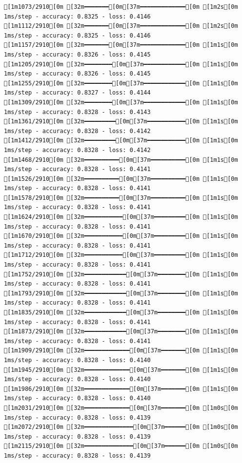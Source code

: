 \documentclass[
  letterpaper,
  DIV=11,
  numbers=noendperiod]{scrartcl}
\begin{document}
\begin{verbatim}
[1m1073/2910[0m [32m━━━━━━━[0m[37m━━━━━━━━━━━━━[0m [1m2s[0m 1ms/step - accuracy: 0.8325 - loss: 0.4146
[1m1112/2910[0m [32m━━━━━━━[0m[37m━━━━━━━━━━━━━[0m [1m2s[0m 1ms/step - accuracy: 0.8325 - loss: 0.4146
[1m1157/2910[0m [32m━━━━━━━[0m[37m━━━━━━━━━━━━━[0m [1m1s[0m 1ms/step - accuracy: 0.8326 - loss: 0.4145
[1m1205/2910[0m [32m━━━━━━━━[0m[37m━━━━━━━━━━━━[0m [1m1s[0m 1ms/step - accuracy: 0.8326 - loss: 0.4145
[1m1255/2910[0m [32m━━━━━━━━[0m[37m━━━━━━━━━━━━[0m [1m1s[0m 1ms/step - accuracy: 0.8327 - loss: 0.4144
[1m1309/2910[0m [32m━━━━━━━━[0m[37m━━━━━━━━━━━━[0m [1m1s[0m 1ms/step - accuracy: 0.8328 - loss: 0.4143
[1m1361/2910[0m [32m━━━━━━━━━[0m[37m━━━━━━━━━━━[0m [1m1s[0m 1ms/step - accuracy: 0.8328 - loss: 0.4142
[1m1412/2910[0m [32m━━━━━━━━━[0m[37m━━━━━━━━━━━[0m [1m1s[0m 1ms/step - accuracy: 0.8328 - loss: 0.4142
[1m1468/2910[0m [32m━━━━━━━━━━[0m[37m━━━━━━━━━━[0m [1m1s[0m 1ms/step - accuracy: 0.8328 - loss: 0.4141
[1m1526/2910[0m [32m━━━━━━━━━━[0m[37m━━━━━━━━━━[0m [1m1s[0m 1ms/step - accuracy: 0.8328 - loss: 0.4141
[1m1578/2910[0m [32m━━━━━━━━━━[0m[37m━━━━━━━━━━[0m [1m1s[0m 1ms/step - accuracy: 0.8328 - loss: 0.4141
[1m1624/2910[0m [32m━━━━━━━━━━━[0m[37m━━━━━━━━━[0m [1m1s[0m 1ms/step - accuracy: 0.8328 - loss: 0.4141
[1m1670/2910[0m [32m━━━━━━━━━━━[0m[37m━━━━━━━━━[0m [1m1s[0m 1ms/step - accuracy: 0.8328 - loss: 0.4141
[1m1712/2910[0m [32m━━━━━━━━━━━[0m[37m━━━━━━━━━[0m [1m1s[0m 1ms/step - accuracy: 0.8328 - loss: 0.4141
[1m1752/2910[0m [32m━━━━━━━━━━━━[0m[37m━━━━━━━━[0m [1m1s[0m 1ms/step - accuracy: 0.8328 - loss: 0.4141
[1m1793/2910[0m [32m━━━━━━━━━━━━[0m[37m━━━━━━━━[0m [1m1s[0m 1ms/step - accuracy: 0.8328 - loss: 0.4141
[1m1835/2910[0m [32m━━━━━━━━━━━━[0m[37m━━━━━━━━[0m [1m1s[0m 1ms/step - accuracy: 0.8328 - loss: 0.4141
[1m1873/2910[0m [32m━━━━━━━━━━━━[0m[37m━━━━━━━━[0m [1m1s[0m 1ms/step - accuracy: 0.8328 - loss: 0.4141
[1m1909/2910[0m [32m━━━━━━━━━━━━━[0m[37m━━━━━━━[0m [1m1s[0m 1ms/step - accuracy: 0.8328 - loss: 0.4140
[1m1945/2910[0m [32m━━━━━━━━━━━━━[0m[37m━━━━━━━[0m [1m1s[0m 1ms/step - accuracy: 0.8328 - loss: 0.4140
[1m1986/2910[0m [32m━━━━━━━━━━━━━[0m[37m━━━━━━━[0m [1m1s[0m 1ms/step - accuracy: 0.8328 - loss: 0.4140
[1m2031/2910[0m [32m━━━━━━━━━━━━━[0m[37m━━━━━━━[0m [1m0s[0m 1ms/step - accuracy: 0.8328 - loss: 0.4139
[1m2072/2910[0m [32m━━━━━━━━━━━━━━[0m[37m━━━━━━[0m [1m0s[0m 1ms/step - accuracy: 0.8328 - loss: 0.4139
[1m2115/2910[0m [32m━━━━━━━━━━━━━━[0m[37m━━━━━━[0m [1m0s[0m 1ms/step - accuracy: 0.8328 - loss: 0.4139

\end{verbatim}
\end{document}
